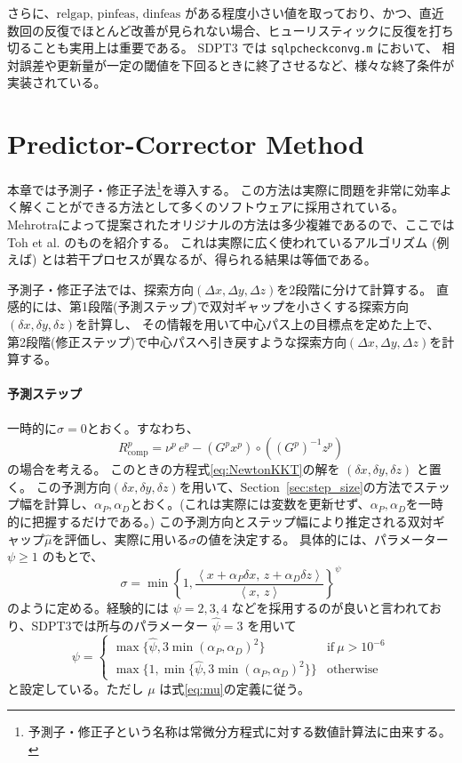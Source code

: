\documentclass{jsarticle}
\newcommand{\inprod}[2]{\left\langle #1, \, #2 \right\rangle}
\begin{document}
さらに、$\mathrm{relgap}$, $\mathrm{pinfeas}$, $\mathrm{dinfeas}$ がある程度小さい値を取っており、かつ、直近数回の反復でほとんど改善が見られない場合、ヒューリスティックに反復を打ち切ることも実用上は重要である。
SDPT3 \cite{toh1999} では \texttt{sqlpcheckconvg.m} において、
相対誤差や更新量が一定の閾値を下回るときに終了させるなど、様々な終了条件が実装されている。


\section{Predictor-Corrector Method}
本章では予測子・修正子法\footnote{予測子・修正子という名称は常微分方程式に対する数値計算法に由来する。}を導入する。
この方法は実際に問題を非常に効率よく解くことができる方法として多くのソフトウェアに採用されている。
Mehrotraによって提案されたオリジナルの方法\cite{Mehrotra1992}は多少複雑であるので、ここではToh et al. \cite{toh1999}のものを紹介する。
これは実際に広く使われているアルゴリズム (例えば\cite{Wright1997}) とは若干プロセスが異なるが、得られる結果は等価である。 


予測子・修正子法では、探索方向$(\Delta x, \Delta y, \Delta z)$を2段階に分けて計算する。
直感的には、第1段階(予測ステップ)で双対ギャップを小さくする探索方向$(\delta x, \delta y, \delta z)$を計算し、
その情報を用いて中心パス上の目標点を定めた上で、
第2段階(修正ステップ)で中心パスへ引き戻すような探索方向$(\Delta x, \Delta y, \Delta z)$を計算する。

\paragraph{予測ステップ} 一時的に$\sigma=0$とおく。すなわち、
\[R^p_{\mathrm{comp}}=\nu^p \, e^p - (G^p x^p) \circ ((G^p)^{-1} z^p)\] 
の場合を考える。
このときの方程式\eqref{eq:NewtonKKT}の解を $(\delta x, \delta y, \delta z)$ と置く。
この予測方向$(\delta x, \delta y, \delta z)$を用いて、Section~\ref{sec:step_size}の方法でステップ幅を計算し、$\alpha_P, \alpha_D$とおく。(これは実際には変数を更新せず、$\alpha_P, \alpha_D$を一時的に把握するだけである。)
この予測方向とステップ幅により推定される双対ギャップ$\hat{\mu}$を評価し、実際に用いる$\sigma$の値を決定する。
具体的には、パラメーター $\psi \ge 1$ のもとで、
\[
   \sigma=\min\left\{1, \frac{\inprod{x + \alpha_P \delta x}{z + \alpha_D \delta z}}{\inprod{x}{z}}\right\}^\psi
\]
のように定める。経験的には $\psi=2,3,4$ などを採用するのが良いと言われており、SDPT3では所与のパラメーター $\hat{\psi}=3$ を用いて
\[
\psi = \begin{cases}
    \max\{\hat{\psi}, 3 \min(\alpha_P, \alpha_D)^2\} & \text{if} ~ \mu > 10^{-6} \\
    \max\{1, \min\{\hat{\psi}, 3 \min(\alpha_P, \alpha_D)^2\}\} & \text{otherwise}
\end{cases}
\]
と設定している。ただし $\mu$ は式\eqref{eq:mu}の定義に従う。
\end{document}

